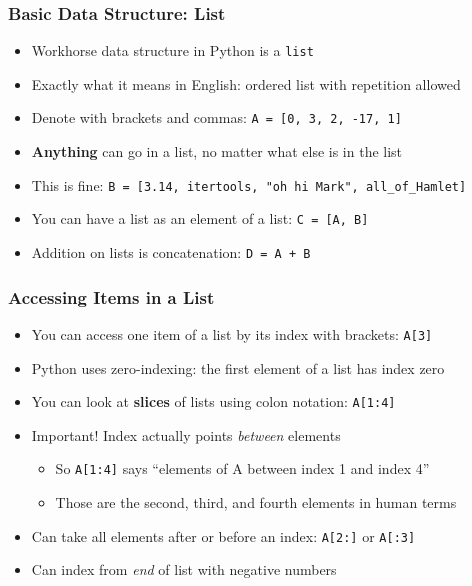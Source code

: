 \documentclass[aspectratio=169, handout]{beamer}
\begin{document}
\begin{frame}
\frametitle{Basic Data Structure: List}

\begin{itemize}
	\item Workhorse data structure in Python is a \texttt{list}
	
	\item Exactly what it means in English: ordered list with repetition allowed
	
	\item Denote with brackets and commas: \texttt{A = [0, 3, 2, -17, 1]}
	
	\item <2->\textbf{Anything} can go in a list, no matter what else is in the list
	
	\item <2->This is fine: \texttt{B = [3.14, itertools, "oh hi Mark", all\_of\_Hamlet]}
	
	\item <3->You can have a list as an element of a list: \texttt{C = [A, B]}
	
	\item <3->Addition on lists is concatenation: \texttt{D = A + B}
\end{itemize}
\end{frame}

\begin{frame}
\frametitle{Accessing Items in a List}

\begin{itemize}
	\item You can access one item of a list by its index with brackets: \texttt{A[3]}
	
	\item Python uses zero-indexing: the first element of a list has index zero
	
	\item <2->You can look at \textbf{slices} of lists using colon notation: \texttt{A[1:4]}
	
	\item <2->Important! Index actually points \textit{between} elements
	\begin{itemize}
		\item <2->So \texttt{A[1:4]} says ``elements of A between index 1 and index 4''
		
		\item <2->Those are the second, third, and fourth elements in human terms
	\end{itemize}

	\item <3->Can take all elements after or before an index: \texttt{A[2:]} or \texttt{A[:3]}
	
	\item <3->Can index from \textit{end} of list with negative numbers
\end{itemize}
\end{frame}
\end{document}
